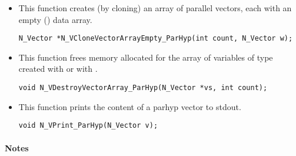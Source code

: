 \begin{itemize}
\item {}
 
  This function creates (by cloning) an array of  parallel vectors,
  each with an empty () data array.
 
\begin{verbatim}
N_Vector *N_VCloneVectorArrayEmpty_ParHyp(int count, N_Vector w);
\end{verbatim}


\item {}
 
 This function frees memory allocated for the array of   variables of
 type  created with  or with
 .
 

 \verb|void N_VDestroyVectorArray_ParHyp(N_Vector *vs, int count);|



\item {}
  
  This function prints the content of a parhyp vector to stdout.
 
    
  \verb|void N_VPrint_ParHyp(N_Vector v);|


\end{itemize}

\paragraph{\bf Notes} 
           
